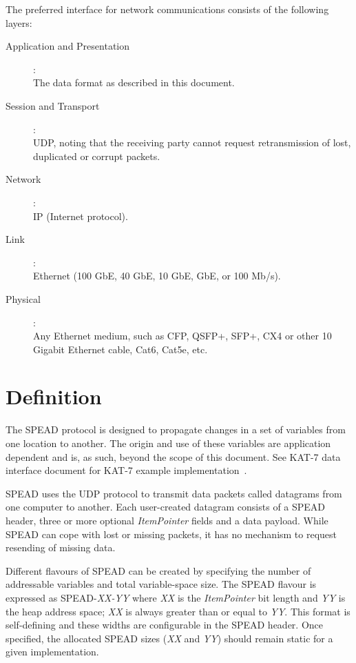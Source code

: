 \documentclass[11pt,english,twoside]{article}
\begin{document}
The preferred interface for network communications consists of the
following layers:
\begin{description}
\item[Application and Presentation]: ~ \\
\hspace{1cm} The data format as described in this document.

\item[Session and Transport]: ~ \\
\hspace{1cm} UDP, noting that the receiving party cannot request retransmission of lost, duplicated or corrupt packets.

\item[Network]: ~ \\
\hspace{1cm} IP (Internet protocol).

\item[Link]: ~ \\
\hspace{1cm} Ethernet (100 GbE, 40 GbE, 10 GbE, GbE, or 100 Mb/s).

\item[Physical]: ~ \\
\hspace{1cm} Any Ethernet medium, such as CFP, QSFP+, SFP+, CX4 or other 10 Gigabit Ethernet cable, Cat6, Cat5e,
etc.
\end{description}


\section{Definition}

The SPEAD protocol is designed to propagate changes in a set of variables from one location to another.  The origin and use of these variables
are application dependent and is, as such, beyond the scope of this document. See KAT-7 data interface document for KAT-7 example
implementation~\cite{speadkat7}.

SPEAD uses the UDP protocol to transmit data packets called datagrams from one computer to another.  Each user-created datagram consists of a
SPEAD header, three or more optional \emph{ItemPointer} fields and a data payload. While SPEAD can cope with lost or missing packets, it has no
mechanism to request resending of missing data.

Different flavours of SPEAD can be created by specifying the number of addressable variables and total variable-space size. The SPEAD flavour is
expressed as SPEAD-\emph{XX-YY} where \emph{XX} is the \emph{ItemPointer} bit length and \emph{YY} is the heap address space; \emph{XX} is
always greater than or equal to \emph{YY}. This format is self-defining and these widths are configurable in the SPEAD header.  Once specified, the
allocated SPEAD sizes (\emph{XX} and \emph{YY}) should remain static for a given implementation.
\end{document}
